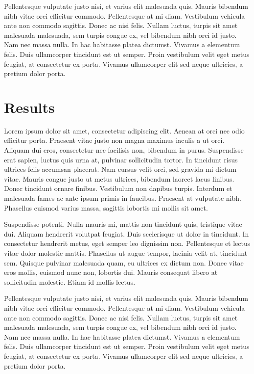 \documentclass[12pt,]{article}
\begin{document}
Pellentesque vulputate justo nisi, et varius elit malesuada quis. Mauris
bibendum nibh vitae orci efficitur commodo. Pellentesque at mi diam.
Vestibulum vehicula ante non commodo sagittis. Donec ac nisi felis.
Nullam luctus, turpis sit amet malesuada malesuada, sem turpis congue
ex, vel bibendum nibh orci id justo. Nam nec massa nulla. In hac
habitasse platea dictumst. Vivamus a elementum felis. Duis ullamcorper
tincidunt est ut semper. Proin vestibulum velit eget metus feugiat, at
consectetur ex porta. Vivamus ullamcorper elit sed neque ultricies, a
pretium dolor porta.

\section{Results}\label{results}

Lorem ipsum dolor sit amet, consectetur adipiscing elit. Aenean at orci
nec odio efficitur porta. Praesent vitae justo non magna maximus iaculis
a ut orci. Aliquam dui eros, consectetur nec facilisis non, bibendum in
purus. Suspendisse erat sapien, luctus quis urna at, pulvinar
sollicitudin tortor. In tincidunt risus ultrices felis accumsan
placerat. Nam cursus velit orci, sed gravida mi dictum vitae. Mauris
congue justo ut metus ultrices, bibendum laoreet lacus finibus. Donec
tincidunt ornare finibus. Vestibulum non dapibus turpis. Interdum et
malesuada fames ac ante ipsum primis in faucibus. Praesent at vulputate
nibh. Phasellus euismod varius massa, sagittis lobortis mi mollis sit
amet.

Suspendisse potenti. Nulla mauris mi, mattis non tincidunt quis,
tristique vitae dui. Aliquam hendrerit volutpat feugiat. Duis
scelerisque ut dolor in tincidunt. In consectetur hendrerit metus, eget
semper leo dignissim non. Pellentesque et lectus vitae dolor molestie
mattis. Phasellus ut augue tempor, lacinia velit at, tincidunt sem.
Quisque pulvinar malesuada quam, eu ultrices ex dictum non. Donec vitae
eros mollis, euismod nunc non, lobortis dui. Mauris consequat libero at
sollicitudin molestie. Etiam id mollis lectus.

Pellentesque vulputate justo nisi, et varius elit malesuada quis. Mauris
bibendum nibh vitae orci efficitur commodo. Pellentesque at mi diam.
Vestibulum vehicula ante non commodo sagittis. Donec ac nisi felis.
Nullam luctus, turpis sit amet malesuada malesuada, sem turpis congue
ex, vel bibendum nibh orci id justo. Nam nec massa nulla. In hac
habitasse platea dictumst. Vivamus a elementum felis. Duis ullamcorper
tincidunt est ut semper. Proin vestibulum velit eget metus feugiat, at
consectetur ex porta. Vivamus ullamcorper elit sed neque ultricies, a
pretium dolor porta.
\end{document}
